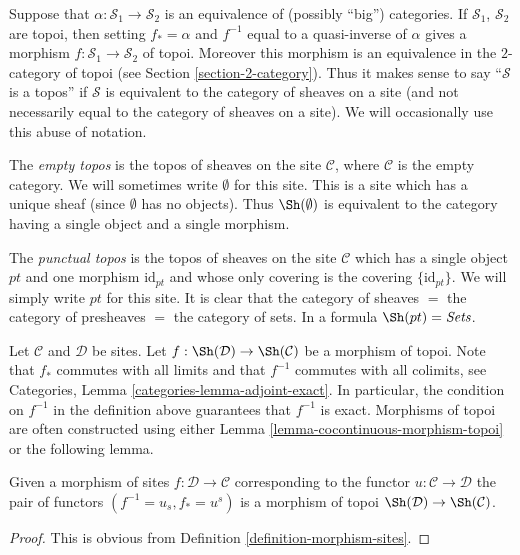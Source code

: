 \noindent
Suppose that $\alpha : \mathcal{S}_1 \to \mathcal{S}_2$ is an equivalence of
(possibly ``big'') categories. If $\mathcal{S}_1$, $\mathcal{S}_2$
are topoi, then setting $f_* = \alpha$ and $f^{-1}$ equal to a quasi-inverse
of $\alpha$ gives a morphism $f : \mathcal{S}_1 \to \mathcal{S}_2$ of topoi.
Moreover this morphism is an equivalence in the $2$-category of topoi (see
Section \ref{section-2-category}).
Thus it makes sense to say ``$\mathcal{S}$ is a topos'' if $\mathcal{S}$
is equivalent to the category of sheaves on a site (and not necessarily
equal to the category of sheaves on a site). We will occasionally
use this abuse of notation.

\medskip\noindent
The {\it empty topos} is the topos
of sheaves on the site $\mathcal{C}$, where $\mathcal{C}$
is the empty category. We will sometimes write $\emptyset$ for this site.
This is a site which has a unique sheaf (since $\emptyset$ has no
objects). Thus $\Sh(\emptyset)$ is equivalent to the category
having a single object and a single morphism.

\medskip\noindent
The {\it punctual topos} is the topos of sheaves on the site
$\mathcal{C}$ which has a single object $pt$ and one morphism
$\text{id}_{pt}$ and whose only covering is the covering
$\{\text{id}_{pt}\}$. We will simply write $pt$ for this site.
It is clear that the category of sheaves $ = $ the category of
presheaves $ = $ the category of sets.
In a formula $\Sh(pt) = \textit{Sets}$.

\medskip\noindent
Let $\mathcal{C}$ and $\mathcal{D}$ be sites. Let
$f : \Sh(\mathcal{D}) \to \Sh(\mathcal{C})$ be a morphism of topoi.
Note that $f_*$ commutes with all limits and that
$f^{-1}$ commutes with all colimits, see Categories,
Lemma \ref{categories-lemma-adjoint-exact}.
In particular, the condition on $f^{-1}$ in the definition above
guarantees that $f^{-1}$ is exact. Morphisms of topoi are often constructed
using either Lemma \ref{lemma-cocontinuous-morphism-topoi}
or the following lemma.

\begin{lemma}
\label{lemma-morphism-sites-topoi}
Given a morphism of sites $f : \mathcal{D} \to \mathcal{C}$
corresponding to the functor $u : \mathcal{C} \to \mathcal{D}$
the pair of functors $(f^{-1} = u_s, f_* = u^s)$ is a morphism of topoi
$\Sh(\mathcal{D}) \to \Sh(\mathcal{C})$.
\end{lemma}

\begin{proof}
This is obvious from Definition \ref{definition-morphism-sites}.
\end{proof}

